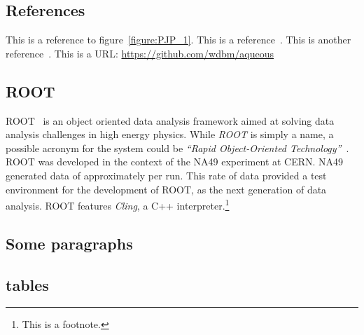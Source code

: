 \subsection{References}

This is a reference to figure~\ref{figure:PJP_1}. This is a reference~\cite{Tianjun_1}. This is another reference~\cite{McCulloch_Pitts_1}. This is a URL: \href{https://github.com/wdbm/aqueous}{\textcolor{black!100}{https://github.com/wdbm/aqueous}}


\subsection{ROOT}

ROOT~\cite{ROOT} is an object oriented data analysis framework aimed at solving data analysis challenges in high energy physics. While \emph{ROOT} is simply a name, a possible acronym for the system could be \emph{``Rapid Object-Oriented Technology''}~\cite{ROOT_acronym}. ROOT was developed in the context of the NA49 experiment at CERN. NA49 generated data of approximately  per run. This rate of data provided a test environment for the development of ROOT, as the next generation of data analysis. ROOT features \emph{Cling}, a C++ interpreter.\footnote{This is a footnote.}

\newpage

\subsection{Some paragraphs}

\lipsum[1-4]

\newpage

\subsection{tables}

